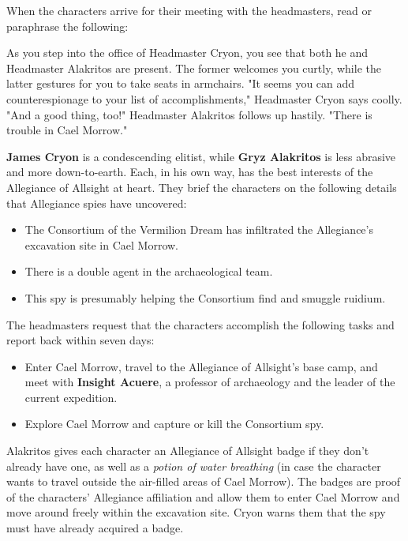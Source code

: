 \documentclass[letterpaper, 11pt, bg=full, twocolumn]{dndbook}
\begin{document}
When the characters arrive for their meeting with the headmasters, read or paraphrase the following:

\begin{DndReadAloud}
As you step into the office of Headmaster Cryon, you see that both he and Headmaster Alakritos are present. The former welcomes you curtly, while the latter gestures for you to take seats in armchairs.
"It seems you can add counterespionage to your list of accomplishments," Headmaster Cryon says coolly.
"And a good thing, too!" Headmaster Alakritos follows up hastily. "There is trouble in Cael Morrow."
\end{DndReadAloud}

\textbf{James Cryon} is a condescending elitist, while \textbf{Gryz Alakritos} is less abrasive and more down-to-earth. Each, in his own way, has the best interests of the Allegiance of Allsight at heart. They brief the characters on the following details that Allegiance spies have uncovered:

\begin{itemize}
\item The Consortium of the Vermilion Dream has infiltrated the Allegiance's excavation site in Cael Morrow.
\item There is a double agent in the archaeological team.
\item This spy is presumably helping the Consortium find and smuggle ruidium.
\end{itemize}

The headmasters request that the characters accomplish the following tasks and report back within seven days:

\begin{itemize}
\item Enter Cael Morrow, travel to the Allegiance of Allsight's base camp, and meet with \textbf{Insight Acuere}, a professor of archaeology and the leader of the current expedition.
\item Explore Cael Morrow and capture or kill the Consortium spy.
\end{itemize}

Alakritos gives each character an Allegiance of Allsight badge if they don't already have one, as well as a \textit{potion of water breathing} (in case the character wants to travel outside the air-filled areas of Cael Morrow). The badges are proof of the characters' Allegiance affiliation and allow them to enter Cael Morrow and move around freely within the excavation site. Cryon warns them that the spy must have already acquired a badge.
\end{document}
